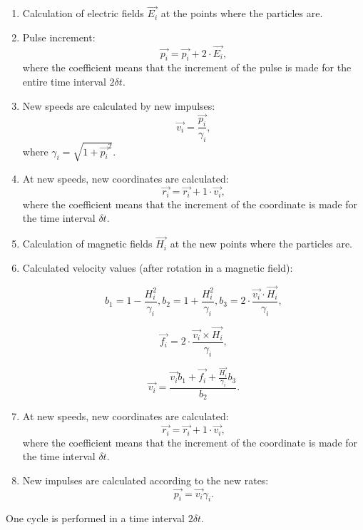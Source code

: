 \begin{enumerate}
    \label{en:algorithm}
    \item Calculation of electric fields $\overrightarrow{E_i}$ at the points where the particles are.
    \item Pulse increment:
    \begin{equation}
        \overrightarrow{p_i} = \overrightarrow{p_i} + 2\cdot\overrightarrow{E_i},
    \end{equation}
    where the coefficient means that the increment of the pulse is made for the entire time interval $2\delta t.$
    \item New speeds are calculated by new impulses:
    \begin{equation}
        \overrightarrow{v_i} = \frac{\overrightarrow{p_i}}{\gamma_i},
    \end{equation}
    where $\gamma_i = \sqrt{1 + \overrightarrow{p_i}^2}.$
    \item At new speeds, new coordinates are calculated:
    \begin{equation}
        \overrightarrow{r_i} = \overrightarrow{r_i} + 1\cdot\overrightarrow{v_i},
    \end{equation}
    where the coefficient means that the increment of the coordinate is made for the time interval $\delta t.$
    \item Calculation of magnetic fields $\overrightarrow{H_i}$ at the new points where the particles are.
    \item Calculated velocity values (after rotation in a magnetic field):
    
    \[
            b_1 = 1 - \frac{H_i^2}{\gamma_i},
            b_2 = 1 + \frac{H_i^2}{\gamma_i}, 
            b_3 = 2\cdot \frac{\overrightarrow{v_i}\cdot\overrightarrow{H_i}}{\gamma_i},
    \]
    
    \[
    \overrightarrow{f_i} = 2\cdot \frac{\overrightarrow{v_i}\times \overrightarrow{H_i}}{\gamma_i},
    \]
    
    \begin{equation}
        \overrightarrow{v_i} = \frac{\overrightarrow{v_i}b_1 + \overrightarrow{f_i} + \frac{\overrightarrow{H_i}}{\gamma_i}b_3}{b_2}.
    \end{equation}
    \item At new speeds, new coordinates are calculated:
    \begin{equation}
        \overrightarrow{r_i} = \overrightarrow{r_i} + 1\cdot\overrightarrow{v_i},
    \end{equation}
    where the coefficient means that the increment of the coordinate is made for the time interval $\delta t.$   
    \item New impulses are calculated according to the new rates:
    \begin{equation}
        \overrightarrow{p_i} = \overrightarrow{v_i}\gamma_i.
    \end{equation}
    
    
\end{enumerate}

One cycle is performed in a time interval $2\delta t.$
